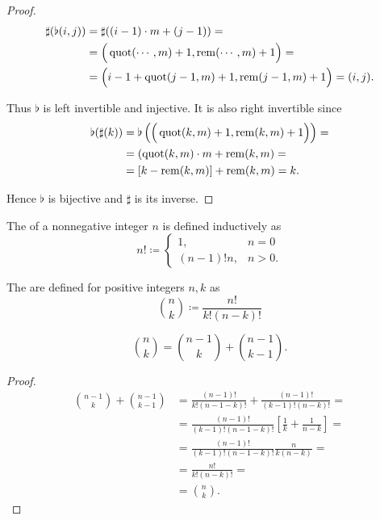 \begin{proof}
  \begin{align*}
    \sharp(\flat(i, j))
    &=
    \sharp((i - 1) \cdot m + (j - 1))
    = \\ &=
    \Big( \operatorname{quot}( \cdots, m) + 1, \operatorname{rem}( \cdots, m) + 1 \Big)
    = \\ &=
    \Big( i - 1 + \operatorname{quot}(j - 1, m) + 1, \operatorname{rem}(j - 1, m) + 1 \Big)
    =
    (i, j).
  \end{align*}

  Thus \( \flat \) is left invertible and injective. It is also right invertible since
  \begin{align*}
    \flat(\sharp(k))
    &=
    \flat\left( \Big( \operatorname{quot}(k, m) + 1, \operatorname{rem}(k, m) + 1 \Big) \right)
    = \\ &=
    (\operatorname{quot}(k, m) \cdot m + \operatorname{rem}(k, m)
    = \\ &=
    [k - \operatorname{rem}(k, m)] + \operatorname{rem}(k, m)
    =
    k.
  \end{align*}

  Hence \( \flat \) is bijective and \( \sharp \) is its inverse.
\end{proof}

\begin{definition}\label{def:factorial}
  The  of a nonnegative integer \( n \) is defined inductively as
  \begin{equation*}
    n! \coloneqq \begin{cases}
      1,          &n = 0 \\
      (n - 1)! n, &n > 0.
    \end{cases}
  \end{equation*}
\end{definition}

\begin{definition}\label{def:binomial_coefficient}
  The  are defined for positive integers \( n, k \) as
  \begin{equation*}
    \binom n k \coloneqq \frac {n!} {k!(n-k)!}
  \end{equation*}
\end{definition}

\begin{theorem}\label{thm:pascals_identity}
  \begin{equation*}
    \binom n k = \binom {n - 1} k + \binom {n - 1} {k - 1}.
  \end{equation*}
\end{theorem}
\begin{proof}
  \begin{align*}
    \binom {n - 1} k + \binom {n - 1} {k - 1}
    &=
    \frac {(n - 1)!} {k! (n - 1 - k)!} + \frac {(n - 1)!} {(k - 1)! (n - k)!}
    = \\ &=
    \frac {(n - 1)!} {(k - 1)! (n - 1 - k)!} \left[ \frac 1 k + \frac 1 {n - k} \right]
    = \\ &=
    \frac {(n - 1)!} {(k - 1)! (n - 1 - k)!} \frac n {k(n - k)}
    = \\ &=
    \frac {n!} {k! (n - k)!}
    = \\ &=
    \binom n k.
  \end{align*}
\end{proof}

